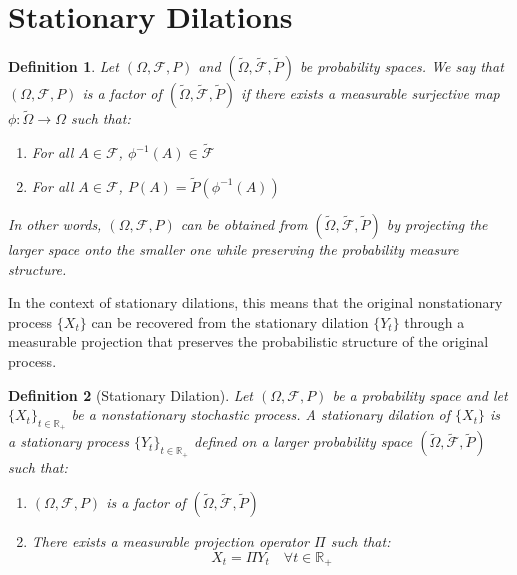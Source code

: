 \documentclass{article}
\newtheorem{definition}{Definition}
\begin{document}
\section{Stationary Dilations}

\begin{definition}
  Let $(\Omega, \mathcal{F}, P)$ and $(\tilde{\Omega}, \tilde{\mathcal{F}},
  \tilde{P})$ be probability spaces. We say that $(\Omega, \mathcal{F}, P)$ is
  a factor of $(\tilde{\Omega}, \tilde{\mathcal{F}}, \tilde{P})$ if there
  exists a measurable surjective map $\phi : \tilde{\Omega} \to \Omega$ such
  that:
  \begin{enumerate}
    \item For all $A \in \mathcal{F}$, $\phi^{- 1} (A) \in
    \tilde{\mathcal{F}}$
    
    \item For all $A \in \mathcal{F}$, $P (A) = \tilde{P} (\phi^{- 1} (A))$
  \end{enumerate}
  In other words, $(\Omega, \mathcal{F}, P)$ can be obtained from
  $(\tilde{\Omega}, \tilde{\mathcal{F}}, \tilde{P})$ by projecting the larger
  space onto the smaller one while preserving the probability measure
  structure.
\end{definition}

\begin{remark}
  In the context of stationary dilations, this means that the original
  nonstationary process $\{X_t \}$ can be recovered from the stationary
  dilation $\{Y_t \}$ through a measurable projection that preserves the
  probabilistic structure of the original process.
\end{remark}

\begin{definition}[Stationary Dilation]
  Let $(\Omega, \mathcal{F}, P)$ be a probability space and let $\{X_t \}_{t
  \in \mathbb{R}_+}$ be a nonstationary stochastic process. A stationary
  dilation of $\{X_t \}$ is a stationary process $\{Y_t \}_{t \in
  \mathbb{R}_+}$ defined on a larger probability space $(\tilde{\Omega},
  \tilde{\mathcal{F}}, \tilde{P})$ such that:
  \begin{enumerate}
    \item $(\Omega, \mathcal{F}, P)$ is a factor of $(\tilde{\Omega},
    \tilde{\mathcal{F}}, \tilde{P})$
    
    \item There exists a measurable projection operator $\Pi$ such that:
    \begin{equation}
      X_t = \Pi Y_t \quad \forall t \in \mathbb{R}_+
    \end{equation}
  \end{enumerate}
\end{definition}
\end{document}
